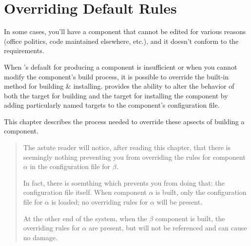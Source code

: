 %
%
%
%
\chapter{Overriding Default Rules} \label{chap:overriding}

In some cases, you'll have a component \makefile that cannot be edited
for various reasons (office politics, code maintained elsewhere,
etc.), and it doesn't conform to the \lmsbw requirements.

When \lmsbw's default for producing a component is insufficient or
when you cannot modify the component's build process, it is possible
to override the built-in method for building \& installing.  \lmsbw
provides the ability to alter the behavior of both the \makefile
target for building and the target for installing the component by
adding particularly named targets to the component's configuration
file.

This chapter describes the process needed to override these apsects of
building a component.

\begin{quote}
  The astute reader will notice, after reading this chapter, that
  there is seemingly nothing preventing you from overriding the rules
  for component $\alpha$ in the configuration file for $\beta$.

  In fact, there is soemthing which prevents you from doing that: the
  configuration file itself.  When component $\alpha$ is built, only
  the configuration file for $\alpha$ is loaded; no overriding rules
  for $\alpha$ will be present.

  At the other end of the system, when the $\beta$ component is built,
  the overriding rules for $\alpha$ are present, but will not be
  referenced and can cause no damage.
\end{quote}

